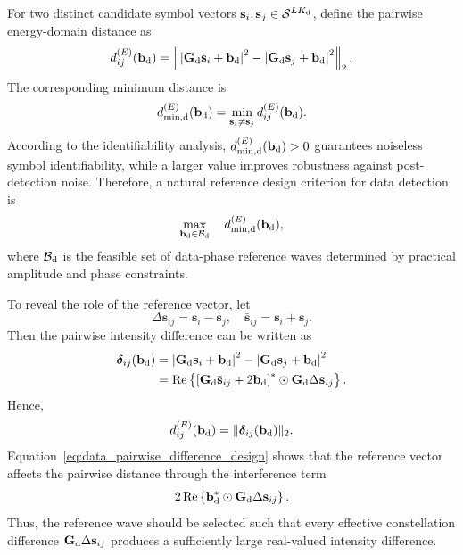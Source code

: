 \documentclass[journal]{IEEEtran}
\begin{document}
For two distinct candidate symbol vectors $\mathbf{s}_i,\mathbf{s}_j\in\mathcal{S}^{LK_{\rm d}}$, define the pairwise energy-domain distance as
\begin{equation}
d_{ij}^{(E)}(\mathbf{b}_{\rm d})
=
\left\|
\left|
\mathbf{G}_{\rm d}\mathbf{s}_i+\mathbf{b}_{\rm d}
\right|^2
-
\left|
\mathbf{G}_{\rm d}\mathbf{s}_j+\mathbf{b}_{\rm d}
\right|^2
\right\|_2.
\label{eq:pairwise_energy_distance_data_design}
\end{equation}
The corresponding minimum distance is
\begin{equation}
d_{\min,{\rm d}}^{(E)}(\mathbf{b}_{\rm d})
=
\min_{\mathbf{s}_i\neq\mathbf{s}_j}
d_{ij}^{(E)}(\mathbf{b}_{\rm d}).
\label{eq:data_dmin_reference_design}
\end{equation}
According to the identifiability analysis, $d_{\min,{\rm d}}^{(E)}(\mathbf{b}_{\rm d})>0$ guarantees noiseless symbol identifiability, while a larger value improves robustness against post-detection noise. 
Therefore, a natural reference design criterion for data detection is
\begin{equation}
\max_{\mathbf{b}_{\rm d}\in\mathcal{B}_{\rm d}}
\quad
d_{\min,{\rm d}}^{(E)}(\mathbf{b}_{\rm d}),
\label{eq:max_min_data_reference_design}
\end{equation}
where $\mathcal{B}_{\rm d}$ is the feasible set of data-phase reference waves determined by practical amplitude and phase constraints.

To reveal the role of the reference vector, let
\begin{equation}
\Delta\mathbf{s}_{ij}
=
\mathbf{s}_i-\mathbf{s}_j,
\quad
\bar{\mathbf{s}}_{ij}
=
\mathbf{s}_i+\mathbf{s}_j.
\end{equation}
Then the pairwise intensity difference can be written as
\begin{equation}
\begin{aligned}
\boldsymbol{\delta}_{ij}(\mathbf{b}_{\rm d})
&=
\left|
\mathbf{G}_{\rm d}\mathbf{s}_i+\mathbf{b}_{\rm d}
\right|^2
-
\left|
\mathbf{G}_{\rm d}\mathbf{s}_j+\mathbf{b}_{\rm d}
\right|^2 \\
&=
\operatorname{Re}
\left\{
\left[
\mathbf{G}_{\rm d}\bar{\mathbf{s}}_{ij}
+
2\mathbf{b}_{\rm d}
\right]^*
\odot
\mathbf{G}_{\rm d}\Delta\mathbf{s}_{ij}
\right\}.
\end{aligned}
\label{eq:data_pairwise_difference_design}
\end{equation}
Hence,
\begin{equation}
d_{ij}^{(E)}(\mathbf{b}_{\rm d})
=
\|\boldsymbol{\delta}_{ij}(\mathbf{b}_{\rm d})\|_2.
\end{equation}
Equation~\eqref{eq:data_pairwise_difference_design} shows that the reference vector affects the pairwise distance through the interference term
\begin{equation}
2\operatorname{Re}
\left\{
\mathbf{b}_{\rm d}^*
\odot
\mathbf{G}_{\rm d}\Delta\mathbf{s}_{ij}
\right\}.
\label{eq:data_reference_interference_term}
\end{equation}
Thus, the reference wave should be selected such that every effective constellation difference $\mathbf{G}_{\rm d}\Delta\mathbf{s}_{ij}$ produces a sufficiently large real-valued intensity difference.
\end{document}
